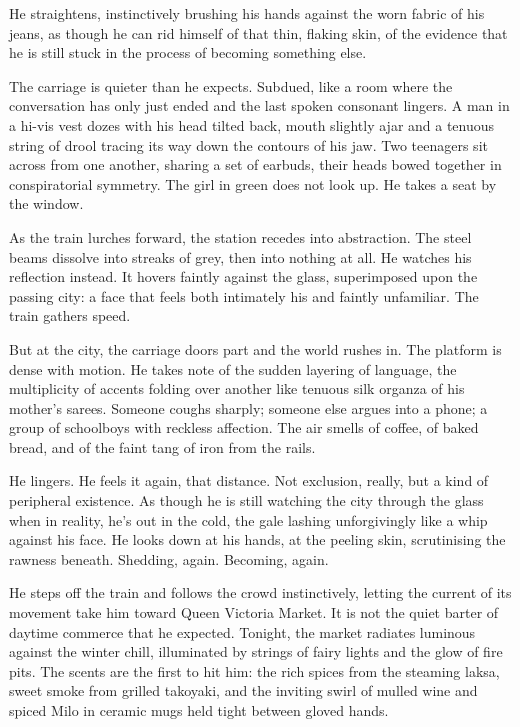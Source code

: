 \documentclass[a4paper]{article}
\begin{document}
He straightens, instinctively brushing his hands against the worn fabric of his jeans, as though he can rid himself of that thin, flaking skin, of the evidence that he is still stuck in the process of becoming something else.

The carriage is quieter than he expects. Subdued, like a room where the conversation has only just ended and the last spoken consonant lingers. A man in a hi-vis vest dozes with his head tilted back, mouth slightly ajar and a tenuous string of drool tracing its way down the contours of his jaw. Two teenagers sit across from one another, sharing a set of earbuds, their heads bowed together in conspiratorial symmetry. The girl in green does not look up. He takes a seat by the window.

As the train lurches forward, the station recedes into abstraction. The steel beams dissolve into streaks of grey, then into nothing at all. He watches his reflection instead. It hovers faintly against the glass, superimposed upon the passing city: a face that feels both intimately his and faintly unfamiliar. The train gathers speed.

But at the city, the carriage doors part and the world rushes in. The platform is dense with motion. He takes note of the sudden layering of language, the multiplicity of accents folding over another like tenuous silk organza of his mother's sarees. Someone coughs sharply; someone else argues into a phone; a group of schoolboys with reckless affection. The air smells of coffee, of baked bread, and of the faint tang of iron from the rails.

He lingers. He feels it again, that distance. Not exclusion, really, but a kind of peripheral existence. As though he is still watching the city through the glass when in reality, he's out in the cold, the gale lashing unforgivingly like a whip against his face. He looks down at his hands, at the peeling skin, scrutinising the rawness beneath. Shedding, again. Becoming, again.

He steps off the train and follows the crowd instinctively, letting the current of its movement take him toward Queen Victoria Market. It is not the quiet barter of daytime commerce that he expected. Tonight, the market radiates luminous against the winter chill, illuminated by strings of fairy lights and the glow of fire pits. The scents are the first to hit him: the rich spices from the steaming laksa, sweet smoke from grilled takoyaki, and the inviting swirl of mulled wine and spiced Milo in ceramic mugs held tight between gloved hands.
\end{document}
